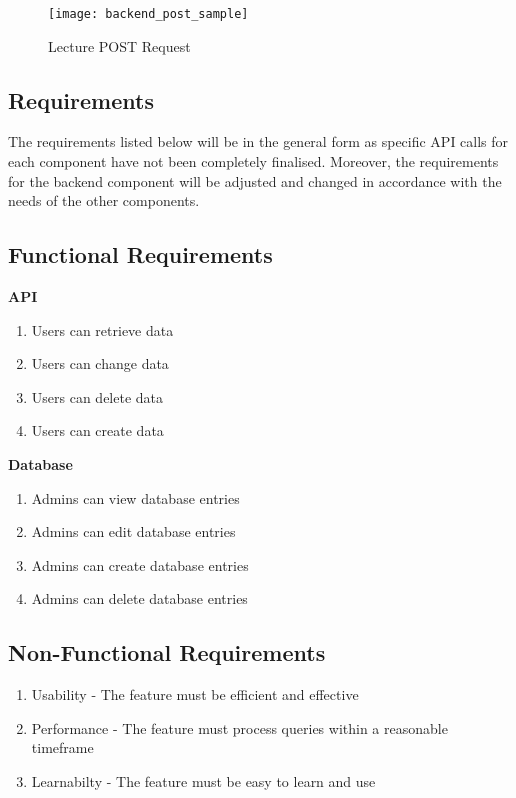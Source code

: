 \begin{figure}[h!]
  \centering
  \texttt{[image: backend\_post\_sample]}
  \caption{Lecture POST Request}
\end{figure}

\newpage
\subsection{Requirements}
The requirements listed below will be in the general form as specific API calls for each 
component have not been completely finalised. Moreover, the requirements for the backend 
component will be adjusted and changed in accordance with the needs of the other components. 

\subsection{Functional Requirements}

\textbf{API}
    \begin{enumerate}
    \item Users can retrieve data
    \item Users can change data
    \item Users can delete data
    \item Users can create data
    \end{enumerate}

\textbf{Database}
    \begin{enumerate}
    \item Admins can view database entries
    \item Admins can edit database entries
    \item Admins can create database entries
    \item Admins can delete database entries
    \end{enumerate}

\subsection{Non-Functional Requirements}
  \begin{enumerate}
    \item Usability - The feature must be efficient and effective
    \item Performance - The feature must process queries within a reasonable timeframe
    \item Learnabilty - The feature must be easy to learn and use
    \end{enumerate}

